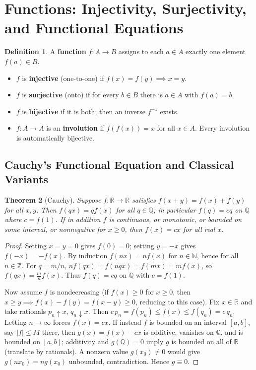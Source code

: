 \documentclass[11pt]{article}
\theoremstyle{plain}
\newtheorem{theorem}{Theorem}[section]
\theoremstyle{definition}
\newtheorem{definition}[theorem]{Definition}
\newcommand{\ZZ}{\mathbb{Z}}
\newcommand{\QQ}{\mathbb{Q}}
\newcommand{\RR}{\mathbb{R}}
\newcommand{\NN}{\mathbb{N}}
\begin{document}
\section{Functions: Injectivity, Surjectivity, and Functional Equations}

\begin{definition}
A \textbf{function} $f\colon A \to B$ assigns to each $a \in A$ exactly one element $f(a)\in B$.
\begin{itemize}
\item $f$ is \textbf{injective} (one-to-one) if $f(x)=f(y) \implies x=y$.
\item $f$ is \textbf{surjective} (onto) if for every $b\in B$ there is $a\in A$ with $f(a)=b$.
\item $f$ is \textbf{bijective} if it is both; then an inverse $f^{-1}$ exists.
\item $f\colon A \to A$ is an \textbf{involution} if $f(f(x)) = x$ for all $x \in A$. Every involution is automatically bijective.
\end{itemize}
\end{definition}

\subsection{Cauchy's Functional Equation and Classical Variants}

\begin{theorem}[Cauchy]\label{thm:cauchy}
Suppose $f\colon \RR \to \RR$ satisfies $f(x+y)=f(x)+f(y)$ for all $x,y$.
Then $f(q x) = q f(x)$ for all $q \in \QQ$; in particular $f(q) = cq$ on $\QQ$
where $c=f(1)$. If in addition $f$ is continuous, or monotonic, or bounded
on some interval, or nonnegative for $x \ge 0$, then $f(x)=cx$ for all real $x$.
\end{theorem}

\begin{proof}
Setting $x=y=0$ gives $f(0)=0$; setting $y=-x$ gives $f(-x)=-f(x)$.
By induction $f(nx)=nf(x)$ for $n\in\NN$, hence for all $n\in\ZZ$.
For $q=m/n$, $n f(qx) = f(nq x) = f(mx) = m f(x)$, so $f(qx)=\frac{m}{n}f(x)$.
Thus $f(q)=cq$ on $\QQ$ with $c=f(1)$.

Now assume $f$ is nondecreasing (if $f(x) \ge 0$ for $x \ge 0$, then $x \ge y \implies f(x)-f(y) = f(x-y) \ge 0$, reducing to this case).
Fix $x\in\RR$ and take rationals $p_n \uparrow x$, $q_n \downarrow x$.
Then $c\,p_n = f(p_n)\le f(x) \le f(q_n) = c\,q_n$. Letting $n\to\infty$
forces $f(x)=cx$. If instead $f$ is bounded on an interval $[a,b]$, say
$|f|\le M$ there, then $g(x) = f(x)-cx$ is additive, vanishes on $\QQ$, and
is bounded on $[a,b]$; additivity and $g(\QQ)=0$ imply $g$ is bounded on all
of $\RR$ (translate by rationals). A nonzero value $g(x_0)\ne 0$ would give
$g(nx_0)=ng(x_0)$ unbounded, contradiction. Hence $g\equiv 0$.
\end{proof}
\end{document}
